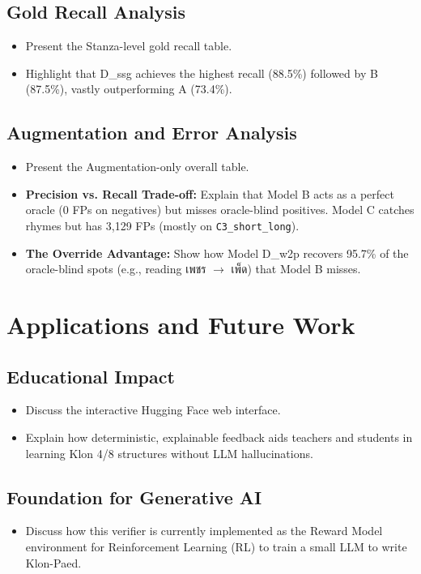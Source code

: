 \documentclass[conference]{IEEEtran}
\begin{document}
\subsection{Gold Recall Analysis}
\begin{itemize}
    \item Present the Stanza-level gold recall table.
    \item Highlight that D\_ssg achieves the highest recall (88.5\%) followed by B (87.5\%), vastly outperforming A (73.4\%).
\end{itemize}

\subsection{Augmentation and Error Analysis}
\begin{itemize}
    \item Present the Augmentation-only overall table.
    \item \textbf{Precision vs. Recall Trade-off:} Explain that Model B acts as a perfect oracle (0 FPs on negatives) but misses oracle-blind positives. Model C catches rhymes but has 3,129 FPs (mostly on \texttt{C3\_short\_long}).
    \item \textbf{The Override Advantage:} Show how Model D\_w2p recovers 95.7\% of the oracle-blind spots (e.g., reading เพชร $\rightarrow$ เพ็ด) that Model B misses.
\end{itemize}

\section{Applications and Future Work}
\subsection{Educational Impact}
\begin{itemize}
    \item Discuss the interactive Hugging Face web interface.
    \item Explain how deterministic, explainable feedback aids teachers and students in learning Klon 4/8 structures without LLM hallucinations.
\end{itemize}

\subsection{Foundation for Generative AI}
\begin{itemize}
    \item Discuss how this verifier is currently implemented as the Reward Model environment for Reinforcement Learning (RL) to train a small LLM to write Klon-Paed.
\end{itemize}
\end{document}

